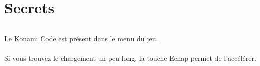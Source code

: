 \documentclass[titlepage, 11px, a4paper]{report}
\begin{document}


\part{Secrets} 
\paragraph*{} \hspace{0pt}
Le Konami Code est présent dans le menu du jeu. \\ \\
Si vous trouvez le chargement un peu long, la touche Echap permet de l'accélérer. \\


\end{document}
